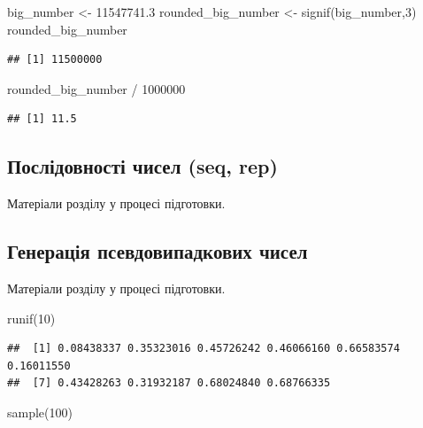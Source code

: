 \documentclass[
]{book}
\newenvironment{Shaded}{\begin{snugshade}}{\end{snugshade}}
\newcommand{\DecValTok}[1]{\textcolor[rgb]{0.00,0.00,0.81}{#1}}
\newcommand{\FloatTok}[1]{\textcolor[rgb]{0.00,0.00,0.81}{#1}}
\newcommand{\FunctionTok}[1]{\textcolor[rgb]{0.00,0.00,0.00}{#1}}
\newcommand{\NormalTok}[1]{#1}
\newcommand{\OtherTok}[1]{\textcolor[rgb]{0.56,0.35,0.01}{#1}}
\newcommand{\SpecialCharTok}[1]{\textcolor[rgb]{0.00,0.00,0.00}{#1}}
\begin{document}
\begin{Shaded}
\begin{Highlighting}[]
\NormalTok{big\_number }\OtherTok{\textless{}{-}} \FloatTok{11547741.3}
\NormalTok{rounded\_big\_number }\OtherTok{\textless{}{-}} \FunctionTok{signif}\NormalTok{(big\_number,}\DecValTok{3}\NormalTok{)}
\NormalTok{rounded\_big\_number}
\end{Highlighting}
\end{Shaded}

\begin{verbatim}
## [1] 11500000
\end{verbatim}

\begin{Shaded}
\begin{Highlighting}[]
\NormalTok{rounded\_big\_number }\SpecialCharTok{/} \DecValTok{1000000}
\end{Highlighting}
\end{Shaded}

\begin{verbatim}
## [1] 11.5
\end{verbatim}

\hypertarget{chapter242}{%
\subsection{Послідовності чисел (seq, rep)}\label{chapter242}}

Матеріали розділу у процесі підготовки.

\hypertarget{chapter243}{%
\subsection{Генерація псевдовипадкових чисел}\label{chapter243}}

Матеріали розділу у процесі підготовки.

\begin{Shaded}
\begin{Highlighting}[]
\FunctionTok{runif}\NormalTok{(}\DecValTok{10}\NormalTok{)}
\end{Highlighting}
\end{Shaded}

\begin{verbatim}
##  [1] 0.08438337 0.35323016 0.45726242 0.46066160 0.66583574 0.16011550
##  [7] 0.43428263 0.31932187 0.68024840 0.68766335
\end{verbatim}

\begin{Shaded}
\begin{Highlighting}[]
\FunctionTok{sample}\NormalTok{(}\DecValTok{100}\NormalTok{)}
\end{Highlighting}
\end{Shaded}
\end{document}
